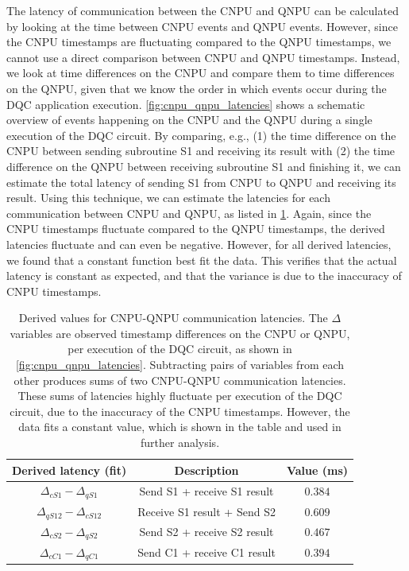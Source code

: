 The latency of communication between the \ac{CNPU} and \ac{QNPU} can be calculated by looking at the time between \ac{CNPU} events and \ac{QNPU} events. However, since the \ac{CNPU} timestamps are fluctuating compared to the \ac{QNPU} timestamps, we cannot use a direct comparison between \ac{CNPU} and QNPU timestamps. Instead, we look at time differences on the \ac{CNPU} and compare them to time differences on the QNPU, given that we know the order in which events occur during the DQC application execution. \cref{fig:cnpu_qnpu_latencies} shows a schematic overview of events happening on the \ac{CNPU} and the \ac{QNPU} during a single execution of the \ac{DQC} circuit. By comparing, e.g., (1) the time difference on the \ac{CNPU} between sending subroutine S1 and receiving its result with (2) the time difference on the \ac{QNPU} between receiving subroutine S1 and finishing it, we can estimate the total latency of sending S1 from \ac{CNPU} to \ac{QNPU} and receiving its result. Using this technique, we can estimate the latencies for each communication between \ac{CNPU} and \ac{QNPU}, as listed in \cref{tab:delta_diffs}. Again, since the \ac{CNPU} timestamps fluctuate compared to the \ac{QNPU} timestamps, the derived latencies fluctuate and can even be negative. However, for all derived latencies, we found that a constant function best fit the data. This verifies that the actual latency is constant as expected, and that the variance is due to the inaccuracy of \ac{CNPU} timestamps.

\begin{table}
    \centering
    \begin{tabular}{|c|c|c|}
    \hline
    \textbf{Derived latency (fit)} & \textbf{Description} & \textbf{Value (ms)} \\ 
    \hline
    $\Delta_{cS1} - \Delta_{qS1}$   & Send S1 + receive S1 result  & $0.384$ \\
    $\Delta_{qS12} - \Delta_{cS12}$ & Receive S1 result + Send S2  & $0.609$ \\
    $\Delta_{cS2} - \Delta_{qS2}$   & Send S2 + receive S2 result  & $0.467$ \\
    $\Delta_{cC1} - \Delta_{qC1}$   & Send C1 + receive C1 result  & $0.394$ \\
    \hline
    \end{tabular}
    \caption{Derived values for \ac{CNPU}-\ac{QNPU} communication latencies. The $\Delta$ variables are observed timestamp differences on the \ac{CNPU} or \ac{QNPU}, per execution of the \ac{DQC} circuit, as shown in \cref{fig:cnpu_qnpu_latencies}. Subtracting pairs of variables from each other produces sums of two \ac{CNPU}-\ac{QNPU} communication latencies. These sums of latencies highly fluctuate per execution of the \ac{DQC} circuit, due to the inaccuracy of the \ac{CNPU} timestamps. However, the data fits a constant value, which is shown in the table and used in further analysis.}
    \label{tab:delta_diffs}
\end{table}

